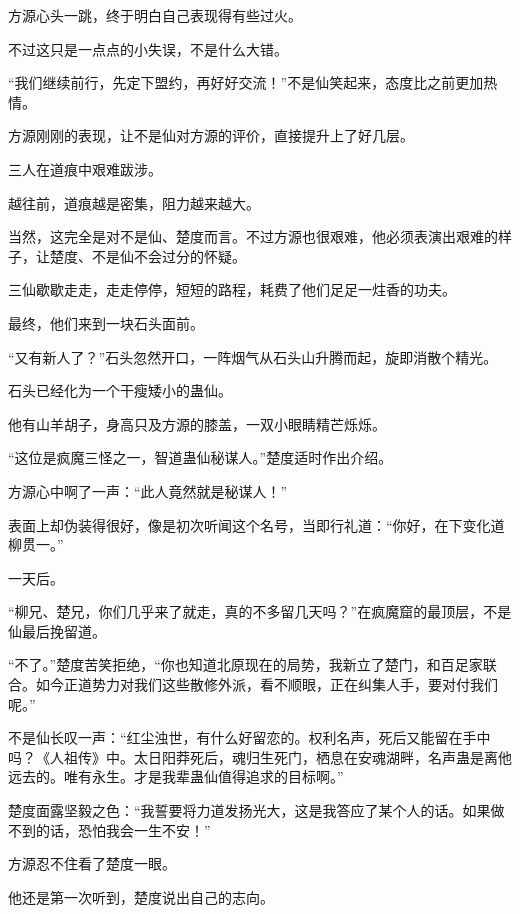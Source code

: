 
\begin{this_body}



方源心头一跳，终于明白自己表现得有些过火。

不过这只是一点点的小失误，不是什么大错。

“我们继续前行，先定下盟约，再好好交流！”不是仙笑起来，态度比之前更加热情。

方源刚刚的表现，让不是仙对方源的评价，直接提升上了好几层。

三人在道痕中艰难跋涉。

越往前，道痕越是密集，阻力越来越大。

当然，这完全是对不是仙、楚度而言。不过方源也很艰难，他必须表演出艰难的样子，让楚度、不是仙不会过分的怀疑。

三仙歇歇走走，走走停停，短短的路程，耗费了他们足足一炷香的功夫。

最终，他们来到一块石头面前。

“又有新人了？”石头忽然开口，一阵烟气从石头山升腾而起，旋即消散个精光。

石头已经化为一个干瘦矮小的蛊仙。

他有山羊胡子，身高只及方源的膝盖，一双小眼睛精芒烁烁。

“这位是疯魔三怪之一，智道蛊仙秘谋人。”楚度适时作出介绍。

方源心中啊了一声：“此人竟然就是秘谋人！”

表面上却伪装得很好，像是初次听闻这个名号，当即行礼道：“你好，在下变化道柳贯一。”

一天后。

“柳兄、楚兄，你们几乎来了就走，真的不多留几天吗？”在疯魔窟的最顶层，不是仙最后挽留道。

“不了。”楚度苦笑拒绝，“你也知道北原现在的局势，我新立了楚门，和百足家联合。如今正道势力对我们这些散修外派，看不顺眼，正在纠集人手，要对付我们呢。”

不是仙长叹一声：“红尘浊世，有什么好留恋的。权利名声，死后又能留在手中吗？《人祖传》中。太日阳莽死后，魂归生死门，栖息在安魂湖畔，名声蛊是离他远去的。唯有永生。才是我辈蛊仙值得追求的目标啊。”

楚度面露坚毅之色：“我誓要将力道发扬光大，这是我答应了某个人的话。如果做不到的话，恐怕我会一生不安！”

方源忍不住看了楚度一眼。

他还是第一次听到，楚度说出自己的志向。


\end{this_body}

